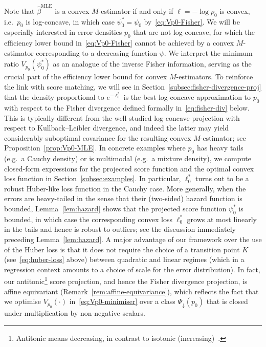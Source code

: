 \documentclass[a4paper]{article}
\theoremstyle{definition}
\begin{document}
Note that $\hat{\beta}^{\mathrm{MLE}}$ is a convex $M$-estimator if and only if $\ell = -\log p_0$ is convex, i.e.\ $p_0$ is log-concave, in which case $\psi_0^* = \psi_0$ by~\eqref{eq:Vp0-Fisher}. We will be especially interested in error densities $p_0$ that are not log-concave, for which the efficiency lower bound in~\eqref{eq:Vp0-Fisher} cannot be achieved by a convex $M$-estimator corresponding to a decreasing function $\psi$.  We interpret the minimum ratio $V_{p_0}(\psi_0^*)$ as an analogue of the inverse Fisher information, serving as the crucial part of the efficiency lower bound for convex $M$-estimators.  To reinforce the link with score matching, we will see in Section~\ref{subsec:fisher-divergence-proj} that the density proportional to $e^{-\ell_0^*}$ is the best log-concave approximation to $p_0$ with respect to the Fisher divergence defined formally in~\eqref{eq:fisher-div} below.  This is typically different from the well-studied log-concave projection with respect to Kullback--Leibler divergence, and indeed the latter may yield considerably suboptimal covariance for the resulting convex $M$-estimator; see Proposition~\ref{prop:Vp0-MLE}. In concrete examples where $p_0$ has heavy tails (e.g.~a Cauchy density) or is multimodal (e.g.~a mixture density), we compute closed-form expressions for the projected score function and the optimal convex loss function in Section~\ref{subsec:examples}. In particular, $\ell_0^*$ turns out to be a robust Huber-like loss function in the Cauchy case. More generally, when the errors are heavy-tailed in the sense that their (two-sided) hazard function is bounded, Lemma~\ref{lem:hazard} shows that the projected score function $\psi_0^*$ is bounded, in which case the corresponding convex loss $\ell_0^*$ grows at most linearly in the tails and hence is robust to outliers; see the discussion immediately preceding Lemma~\ref{lem:hazard}. A major advantage of our framework over the use of the Huber loss is that it does not require the choice of a transition point $K$ (see~\eqref{eq:huber-loss} above) between quadratic and linear regimes (which in a regression context amounts to a choice of scale for the error distribution).  In fact, our antitonic\footnote{Antitonic means decreasing, in contrast to isotonic (increasing)~\citep[Section~2.1]{groeneboom14nonparametric}.} score projection, and hence the Fisher divergence projection, is affine equivariant (Remark~\ref{rem:affine-equivariance}), which reflects the fact that we optimise $V_{p_0}(\cdot)$ in~\eqref{eq:Vp0-minimiser} over a class $\Psi_\downarrow(p_0)$ that is closed under multiplication by non-negative scalars.
\end{document}
